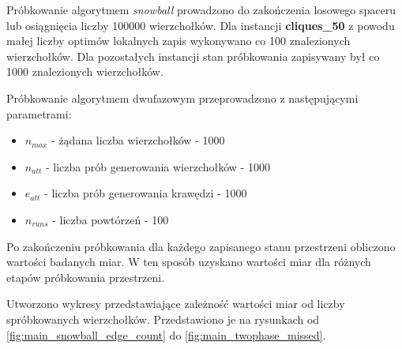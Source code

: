 Próbkowanie algorytmem \textit{snowball} prowadzono do zakończenia losowego spaceru lub osiągnięcia liczby 100000 wierzchołków.
Dla instancji \textbf{cliques\_50} z powodu małej liczby optimów lokalnych zapis wykonywano co 100 znalezionych wierzchołków.
Dla pozostałych instancji stan próbkowania zapisywany był co 1000 znalezionych wierzchołków.

Próbkowanie algorytmem dwufazowym przeprowadzono z następującymi parametrami:
\begin{itemize}
    \item $n_{max}$ - żądana liczba wierzchołków - 1000
    \item $n_{att}$ - liczba prób generowania wierzchołków - 1000
    \item $e_{att}$ - liczba prób generowania krawędzi - 1000
    \item $n_{runs}$ - liczba powtórzeń - 100
\end{itemize}

Po zakończeniu próbkowania dla każdego zapisanego stanu przestrzeni obliczono wartości badanych miar. W ten sposób uzyskano
wartości miar dla różnych etapów próbkowania przestrzeni.

Utworzono wykresy przedstawiające zależność wartości miar od liczby spróbkowanych wierzchołków.
Przedstawiono je na rysunkach od \ref{fig:main_snowball_edge_count} do \ref{fig:main_twophase_missed}.

\def\metrics{
    {edge_count/Liczba krawędzi},
    {edge_to_node/Stosunek liczby krawędzi do liczby wierzchołków},
    {assortativity_deg/Współczynnik różnorodności grafu},
    {avg_fitness/Średnia wartość funkcji celu w znalezionych optimach lokalnych},
    {conrel/Współczynnik conrel},
    {density/Gęstość grafu},
    {distLO/Współczynnik distLO},
    {reciprocity/Współczynnik wzajemności grafu},
    {largest_clique_size/Rozmiar największej kliki w grafie},
    {num_sources/Liczba źródeł w grafie},
    {num_sinks/Liczba ścieków w grafie},
    {num_subsinks/Liczba subsinks w grafie},
    {avg_in_degree/Średni stopień wchodzący wierzchołków w grafie},
    {max_in_degree/Maksymalny stopień wchodzący wśród wierzchołków w grafie},
    {max_out_degree/Średni stopień wychodzący wierzchołków w grafie},
    {avg_out_degree/Maksymalny stopień wychodzący wśród wierzchołków w grafie},
    {avg_loop_weight/Średnia waga pętli w grafie},
    {avg_path_len/Średnia długość ścieżki w grafie},
    {avg_go_path_len/Średnia długość istniejących ścieżek do globalnego optimum},
    {max_go_path_len/Długość najdłuższej istniejącej ścieżki do globalnego optimum},
    {go_path_ratio/Stosunek liczby wierzchołków, z których istnieje ścieżka do globalnego optimum do liczby wszystkich wierzchołków},
    {funnel_num/Liczba lejów w przestrzeni},
    {max_funnel_size/Rozmiar największego leja w przestrzeni},
    {mean_funnel_size/Średni rozmiar lejów w przestrzeni},
    {num_cc/Liczba spójnych podgrafów},
    {largest_cc/Rozmiar największego spójnego podgrafu},
    {largest_cc_radius/Promień największego spójnego podgrafu}}

